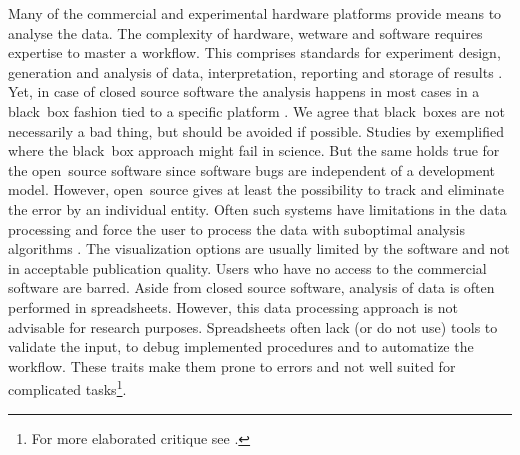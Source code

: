 Many of the commercial and experimental hardware platforms provide means to 
analyse the data. The complexity of hardware, wetware and software requires 
expertise to master a workflow. This comprises standards for experiment design, 
generation and analysis of data, interpretation, reporting and storage of 
results \citep{huggett_BDQ_2014}. Yet, in case of closed source software the 
analysis happens in most cases in a black~box fashion tied to a specific 
platform \citep{roediger_RJ_2013, Spiess_2014}. We agree that black~boxes are not necessarily 
a bad thing, but should be avoided if possible. Studies by 
\citet{mccullough_2008, Almiron_2010, Duran_2014} exemplified where the 
black~box approach might fail in science. But the same holds true for the 
open~source software since software bugs are independent of a development model. 
However, open~source gives at least the possibility to track and eliminate  the 
error by an individual entity. Often such systems have limitations in the data 
processing and force the user to process the data with suboptimal analysis 
algorithms \citep{ruijter_2013}. The visualization options are usually limited 
by the software and not in acceptable publication quality. Users who have no 
access to the commercial software are barred. Aside from closed source software, 
analysis of data is often performed in spreadsheets. However, this data 
processing approach is not advisable for research purposes. Spreadsheets often 
lack (or do not use) tools to validate the input, to debug implemented 
procedures and to automatize the workflow. These traits make them prone to 
errors and not well suited for complicated tasks\footnote{For more elaborated 
critique see \citet{mccullough_2008, burns_2014}.}.

